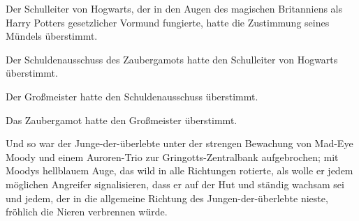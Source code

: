 Der Schulleiter von Hogwarts, der in den Augen des magischen Britanniens als Harry Potters gesetzlicher Vormund fungierte, hatte die Zustimmung seines Mündels überstimmt.

Der Schuldenausschuss des Zaubergamots hatte den Schulleiter von Hogwarts überstimmt.

Der Großmeister hatte den Schuldenausschuss überstimmt.

Das Zaubergamot hatte den Großmeister überstimmt.

Und so war der Junge-der-überlebte unter der strengen Bewachung von Mad-Eye Moody und einem Auroren-Trio zur Gringotts-Zentralbank aufgebrochen; mit Moodys hellblauem Auge, das wild in alle Richtungen rotierte, als wolle er jedem möglichen Angreifer signalisieren, dass er auf der Hut und ständig wachsam sei und jedem, der in die allgemeine Richtung des Jungen-der-überlebte nieste, fröhlich die Nieren verbrennen würde.

